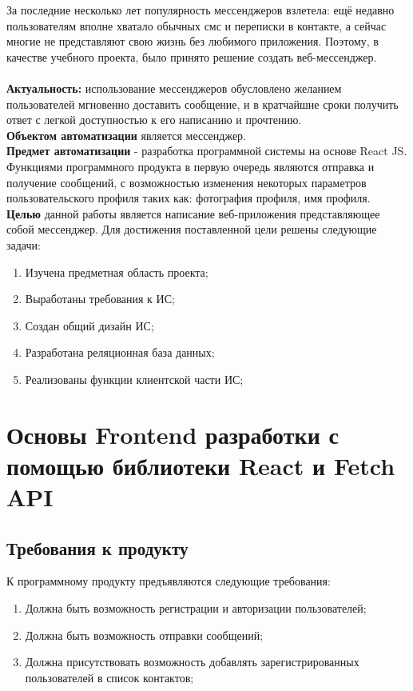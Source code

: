 \documentclass[14pt,final]{report}
\begin{document}
\label{chap:intro}
За последние несколько лет популярность мессенджеров взлетела: ещё недавно пользователям вполне хватало обычных смс и переписки в контакте, а сейчас многие не представляют свою жизнь без любимого приложения. Поэтому, в качестве учебного проекта, было принято решение создать веб-мессенджер.\\
\\ \noindent
\textbf{Актуальность:} использование мессенджеров обусловлено желанием пользователей мгновенно доставить сообщение, и в кратчайшие сроки получить ответ с легкой доступностью к его написанию и прочтению.\\
\textbf{Объектом автоматизации} является мессенджер.\\
\textbf{Предмет автоматизации} - разработка программной системы на основе React JS.\\
Функциями программного продукта в первую очередь являются отправка и получение сообщений, с возможностью изменения некоторых параметров пользовательского профиля таких как: фотография профиля, имя профиля.\\
\textbf{Целью} данной работы является написание веб-приложения представляющее собой мессенджер. Для достижения поставленной цели решены
следующие задачи:\\
\begin{enumerate}
    \item Изучена предметная область проекта;
    \item Выработаны требования к ИС;
    \item Создан общий дизайн ИС;
    \item Разработана реляционная база данных;
    \item Реализованы функции клиентской части ИС;
\end{enumerate}

\chapter{Основы Frontend разработки с помощью библиотеки React и Fetch API}

\section{Требования к продукту}
К программному продукту предъявляются следующие требования:

\begin{enumerate}
    \item Должна быть возможность регистрации и авторизации пользователей;
    \item Должна быть возможность отправки сообщений;
    \item Должна присутствовать возможность добавлять зарегистрированных пользователей в список контактов;
\end{enumerate}
\end{document}
